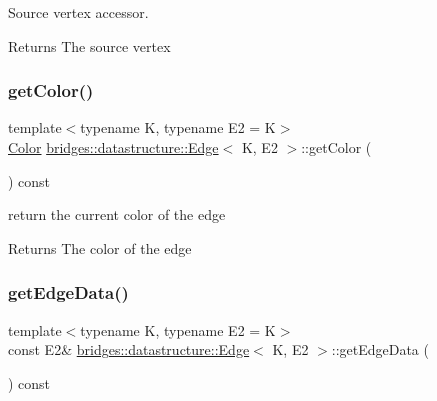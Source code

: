 Source vertex accessor. 

\begin{DoxyReturn}{Returns}
The source vertex 
\end{DoxyReturn}
\mbox{\label{classbridges_1_1datastructure_1_1_edge_abb5c66b734e1ac71e5d4e012908ec7a4}} 
\subsubsection{\texorpdfstring{get\+Color()}{getColor()}}
{\footnotesize\ttfamily template$<$typename K, typename E2 = K$>$ \\
\hyperlink{classbridges_1_1datastructure_1_1_color}{Color} \hyperlink{classbridges_1_1datastructure_1_1_edge}{bridges\+::datastructure\+::\+Edge}$<$ K, E2 $>$\+::get\+Color (\begin{DoxyParamCaption}{ }\end{DoxyParamCaption}) const\hspace{0.3cm}{\ttfamily [inline]}}



return the current color of the edge 

\begin{DoxyReturn}{Returns}
The color of the edge 
\end{DoxyReturn}
\mbox{\label{classbridges_1_1datastructure_1_1_edge_a4769b5d8fc74522f77f5927b230ced7b}} 
\subsubsection{\texorpdfstring{get\+Edge\+Data()}{getEdgeData()}\hspace{0.1cm}{\footnotesize\ttfamily [1/2]}}
{\footnotesize\ttfamily template$<$typename K, typename E2 = K$>$ \\
const E2\& \hyperlink{classbridges_1_1datastructure_1_1_edge}{bridges\+::datastructure\+::\+Edge}$<$ K, E2 $>$\+::get\+Edge\+Data (\begin{DoxyParamCaption}{ }\end{DoxyParamCaption}) const\hspace{0.3cm}{\ttfamily [inline]}}



